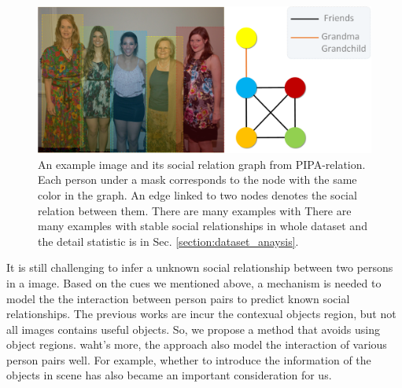 \documentclass{article}
\begin{document}
\begin{figure}[htpb]
	\centering
	\includegraphics[width=0.48 \textwidth,clip]{./pic/example.png}
 \caption{An example image and its social relation graph from PIPA-relation. 
Each person under a mask corresponds to the node with the same color in the graph. An edge linked to two nodes denotes the social relation between them. 
There are many examples with 
There are many examples with stable social relationships in whole dataset and the detail statistic is in Sec. \ref{section:dataset_anaysis}.}
	\vspace*{-3.5mm}
	\label{fig:example}
\end{figure}



It is still challenging to infer a unknown social relationship between two persons in a image. 
Based on the cues we mentioned above, a mechanism is needed to model the the interaction between person pairs to predict known social relationships. 
The previous works are incur the contexual objects region, but not all images contains useful objects. So, we propose a method that avoids using object regions. waht's more, the approach also model the interaction of various person pairs well. 
For example, whether to introduce the information of the objects in scene has also became an important consideration for us.
\end{document}

